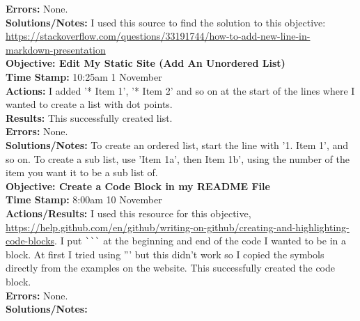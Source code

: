 \documentclass{article}
\begin{document}
\begin{FlushLeft}
\textbf{Errors:} None.\\
\textbf{Solutions/Notes:} I used this source to find the solution to this objective: \url{https://stackoverflow.com/questions/33191744/how-to-add-new-line-in-markdown-presentation}\\
\vspace{5mm}
\textbf{Objective: Edit My Static Site (Add An Unordered List)}\\
\textbf{Time Stamp:} 10:25am 1 November\\
\textbf{Actions:} I added '* Item 1', '* Item 2' and so on at the start of the lines where I wanted to create a list with dot points. \\
\textbf{Results:} This successfully created list.\\
\textbf{Errors:} None.\\
\textbf{Solutions/Notes:} To create an ordered list, start the line with '1. Item 1', and so on. To create a sub list, use 'Item 1a', then Item 1b', using the number of the item you want it to be a sub list of.\\
\vspace{5mm}
\textbf{Objective: Create a Code Block in my README File}\\
\textbf{Time Stamp:} 8:00am 10 November\\
\textbf{Actions/Results:} I used this resource for this objective, \url{https://help.github.com/en/github/writing-on-github/creating-and-highlighting-code-blocks}. I put \verb|```| at the beginning and end of the code I wanted to be in a block. At first I tried using ''' but this didn't work so I copied the symbols directly from the examples on the website. This successfully created the code block. \\
\textbf{Errors:} None.\\
\textbf{Solutions/Notes:}\\

\pagebreak


\end{FlushLeft}
\end{document}
